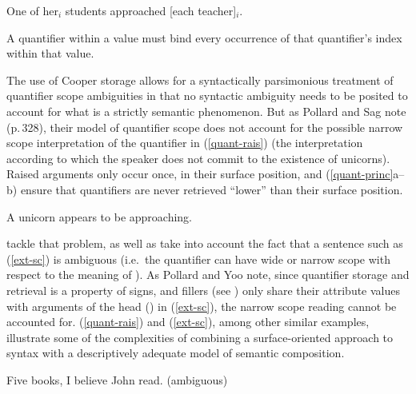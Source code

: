 \documentclass[output=paper
	        ,collection
	        ,collectionchapter
 	        ,biblatex
                ,babelshorthands
                ,newtxmath
                ,draftmode
                ,colorlinks, citecolor=brown
]{langscibook}
\begin{document}
\begin{exe}
\ex\label{quant-ex}
One of her$_{i}$ students approached [each teacher]$_{i}$. \citep[Example 27a]{PollardandSag1994}
\end{exe}

\begin{exe}
\ex\label{quant-bind}A quantifier within a  value must bind every occurrence of that quantifier's index within that  value.  
\end{exe}

The use of Cooper storage allows for a syntactically parsimonious treatment of quantifier scope ambiguities in that no syntactic ambiguity needs to be posited to account for what is a strictly semantic phenomenon. But as Pollard and Sag note (p.\,328), their model of quantifier scope does not account for the possible narrow scope interpretation of the quantifier  in (\ref{quant-rais}) (the interpretation according to which the speaker does not commit to the existence of unicorns). Raised arguments only occur once, in their surface position, and (\ref{quant-princ}a--b) ensure that quantifiers are never retrieved ``lower'' than their surface position.

\begin{exe}
\ex\label{quant-rais}A unicorn appears to be approaching.
\end{exe}

\citet{PollardandYoo1998} tackle that problem, as well as take into account the fact that a sentence such as (\ref{ext-sc}) is ambiguous (i.e.\ the quantifier  can have wide or narrow scope with respect to the meaning of ). As Pollard and Yoo note, since quantifier storage and retrieval is a property of signs, and fillers (see ) only share their  attribute values with arguments of the head () in (\ref{ext-sc}), the narrow scope reading cannot be accounted for. (\ref{quant-rais}) and (\ref{ext-sc}), among other similar examples, illustrate some of the complexities of combining a surface-oriented approach to syntax with a descriptively adequate model of semantic composition.

\begin{exe}
\ex\label{ext-sc}
Five books, I believe John read. (ambiguous)
\end{exe}
\end{document}

